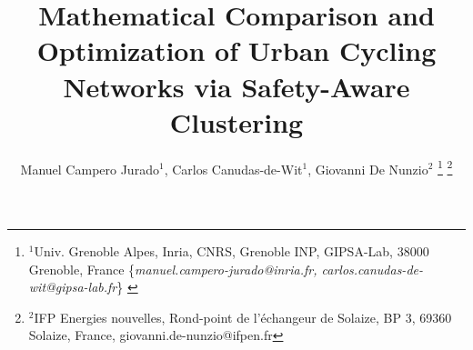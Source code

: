 \documentclass[lettersize,journal]{IEEEtran}
\begin{document}
\title{Mathematical Comparison and Optimization of Urban Cycling Networks via Safety-Aware Clustering}

\author{Manuel Campero Jurado$^{1}$, Carlos Canudas-de-Wit$^{1}$, Giovanni De Nunzio$^{2}$%
\thanks{$^{1}$Univ. Grenoble Alpes, Inria, CNRS, Grenoble INP, GIPSA-Lab, 38000 Grenoble, France
        {\footnotesize \{\textit{manuel.campero-jurado@inria.fr, carlos.canudas-de-wit@gipsa-lab.fr}\} }}%
\thanks{$^{2}$IFP Energies nouvelles,
Rond-point de l’échangeur de Solaize, BP 3, 69360 Solaize, France,
        {\footnotesize giovanni.de-nunzio@ifpen.fr}}%
}




\maketitle
\end{document}
